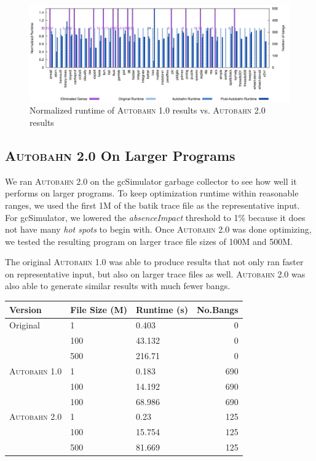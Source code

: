 \documentclass[format=sigplan]{acmart}
\newcommand{\hotspots}[0]{\textit{hot spots}}
\newcommand{\Ao}[0]{\textsc{Autobahn 1.0}}
\newcommand{\At}[0]{\textsc{Autobahn 2.0}}
\newcommand{\absim}[0]{\textit{absenceImpact}}
\begin{document}
\begin{figure}
\includegraphics[width=\textwidth]{pap2}
\caption{Normalized runtime of \Ao{} results vs. \At{} results}
\end{figure}

\subsection{\At{} On Larger Programs}

We ran \At{} on the gcSimulator garbage collector to see how well it performs on larger programs. To keep optimization runtime within reasonable ranges, we used the first 1M of the batik trace file as the representative input. For gcSimulator, we lowered the \absim{} threshold to 1\% because it does not have many \hotspots{} to begin with. Once \At{} was done optimizing, we tested the resulting program on larger trace file sizes of 100M and 500M. 

The original \Ao{} was able to produce results that not only ran faster on representative input, but also on larger trace files as well. \At{} was also able to generate similar results with much fewer bangs. 

\begin{tabular}{lllr}
\hline
Version   & File Size (M) & Runtime (s) & No.Bangs \\
\hline
Original      & 1   &   0.403	 & 0   \\
          & 100        & 43.132      & 0 \\
       & 500     &  216.71 & 0 \\
\Ao{}       & 1     & 0.183    &  690\\
          & 100        & 14.192	 &  690\\
                 & 100        & 68.986	& 690\\
\At{}      & 1   &  0.23 & 125    \\
          & 100        & 15.754 & 125      \\
       & 500    & 81.669 & 125    \\

\hline
\end{tabular}
\end{document}
